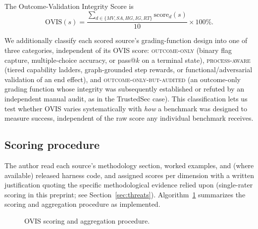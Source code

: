 \documentclass[10pt,twocolumn]{article}
\begin{document}
\noindent The Outcome-Validation Integrity Score is
\begin{equation}
\mathrm{OVIS}(s) = \frac{\sum_{d \in \{MV,SA,HG,IG,RT\}} \mathrm{score}_d(s)}{10}\times 100\%.
\label{eq:ovis}
\end{equation}

We additionally classify each scored source's grading-function design
into one of three categories, independent of its OVIS score:
\textsc{outcome-only} (binary flag capture, multiple-choice accuracy, or
pass@$k$ on a terminal state), \textsc{process-aware} (tiered capability
ladders, graph-grounded step rewards, or functional/adversarial
validation of an end effect), and \textsc{outcome-only-but-audited} (an
outcome-only grading function whose integrity was subsequently
established or refuted by an independent manual audit, as in the
TrustedSec case). This classification lets us test whether OVIS varies
systematically with \emph{how} a benchmark was designed to measure
success, independent of the raw score any individual benchmark receives.

\subsection{Scoring procedure}
The author read each source's methodology section, worked examples, and
(where available) released harness code, and assigned scores per
dimension with a written justification quoting the specific
methodological evidence relied upon (single-rater scoring in this
preprint; see Section~\ref{sec:threats}). Algorithm~\ref{alg:ovis}
summarizes the scoring and aggregation procedure as implemented.

\begin{figure}[t]
\centering
{}
\caption{OVIS scoring and aggregation procedure.}
\label{alg:ovis}
\end{figure}
\end{document}
